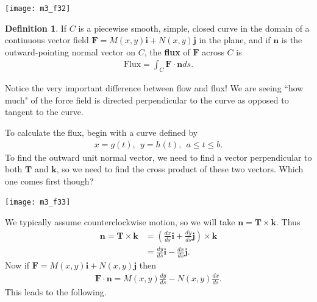 \documentclass[12pt, letter]{article}
\theoremstyle{plain}
\numberwithin{theorem}{section}
\theoremstyle{definition}
\newtheorem{definition}[theorem]{Definition}
\begin{document}
\bigskip

\begin{center}
\texttt{[image: m3\_f32]}
\end{center}

\bigskip

\hrulefill

\bigskip

\begin{definition}
If $C$ is a piecewise smooth, simple, closed curve in the domain of a continuous vector field $\bm{F} = M(x,y)\bm{i}+N(x,y)\bm{j}$ in the plane, and if $\bm{n}$ is the outward-pointing normal vector on $C$, the \textbf{flux} of $\bm{F}$ across $C$ is
\begin{align*}
\text{Flux} = \int_C \bm{F}\cdot\bm{n}ds.
\end{align*}
\end{definition}

\bigskip

Notice the very important difference between flow and flux! We are seeing ``how much" of the force field is directed perpendicular to the curve as opposed to tangent to the curve.

\bigskip

\hrulefill

\bigskip

To calculate the flux, begin with a curve defined by
\begin{align*}
x=g(t), \ \ y=h(t), \ \ a\leq t \leq b.
\end{align*}
To find the outward unit normal vector, we need to find a vector perpendicular to both $\bm{T}$ and $\bm{k}$, so we need to find the cross product of these two vectors. Which one comes first though?

\bigskip

\begin{center}
\texttt{[image: m3\_f33]}
\end{center}

\bigskip

We typically assume counterclockwise motion, so we will take $\bm{n} = \bm{T}\times\bm{k}$. Thus
\begin{align*}
\bm{n} = \bm{T}\times\bm{k} &= \left(\frac{dx}{ds}\bm{i}+\frac{dy}{ds}\bm{j}\right)\times\bm{k}\\
&= \frac{dy}{ds}\bm{i}-\frac{dx}{ds}\bm{j}.
\end{align*}
Now if $\bm{F} = M(x,y)\bm{i}+N(x,y)\bm{j}$ then
\begin{align*}
\bm{F}\cdot\bm{n} = M(x,y)\frac{dy}{ds}-N(x,y)\frac{dx}{ds}.
\end{align*}
This leads to the following.
\end{document}
